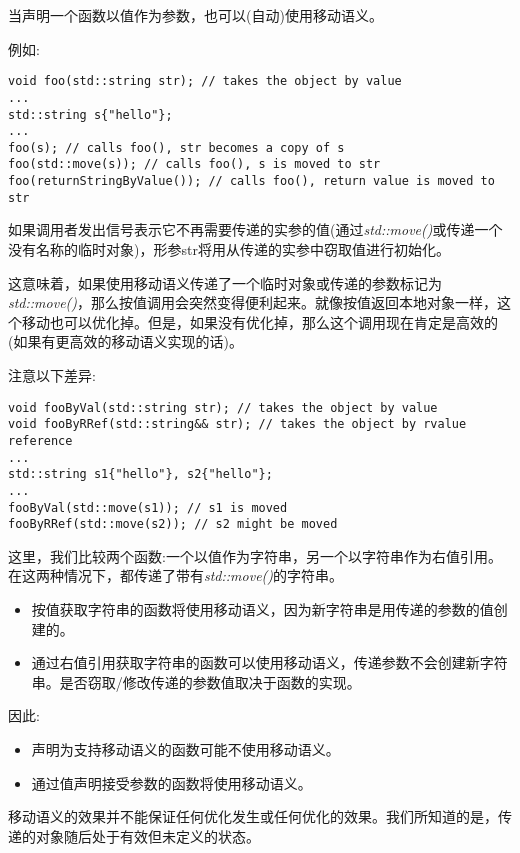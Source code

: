 当声明一个函数以值作为参数，也可以(自动)使用移动语义。\par

例如:\par

\begin{lstlisting}[caption={}]
void foo(std::string str); // takes the object by value
...
std::string s{"hello"};
...
foo(s); // calls foo(), str becomes a copy of s
foo(std::move(s)); // calls foo(), s is moved to str
foo(returnStringByValue()); // calls foo(), return value is moved to str
\end{lstlisting}

如果调用者发出信号表示它不再需要传递的实参的值(通过\textit{std::move()}或传递一个没有名称的临时对象)，形参str将用从传递的实参中窃取值进行初始化。\par

这意味着，如果使用移动语义传递了一个临时对象或传递的参数标记为\textit{std::move()}，那么按值调用会突然变得便利起来。就像按值返回本地对象一样，这个移动也可以优化掉。但是，如果没有优化掉，那么这个调用现在肯定是高效的(如果有更高效的移动语义实现的话)。\par

注意以下差异:\par

\begin{lstlisting}[caption={}]
void fooByVal(std::string str); // takes the object by value
void fooByRRef(std::string&& str); // takes the object by rvalue reference
...
std::string s1{"hello"}, s2{"hello"};
...
fooByVal(std::move(s1)); // s1 is moved
fooByRRef(std::move(s2)); // s2 might be moved
\end{lstlisting}

这里，我们比较两个函数:一个以值作为字符串，另一个以字符串作为右值引用。在这两种情况下，都传递了带有\textit{std::move()}的字符串。\par

\begin{itemize}
	\item 按值获取字符串的函数将使用移动语义，因为新字符串是用传递的参数的值创建的。
	\item 通过右值引用获取字符串的函数可以使用移动语义，传递参数不会创建新字符串。是否窃取/修改传递的参数值取决于函数的实现。
\end{itemize}

因此:\par

\begin{itemize}
	\item 声明为支持移动语义的函数可能不使用移动语义。
	\item 通过值声明接受参数的函数将使用移动语义。
\end{itemize}

移动语义的效果并不能保证任何优化发生或任何优化的效果。我们所知道的是，传递的对象随后处于有效但未定义的状态。\par













